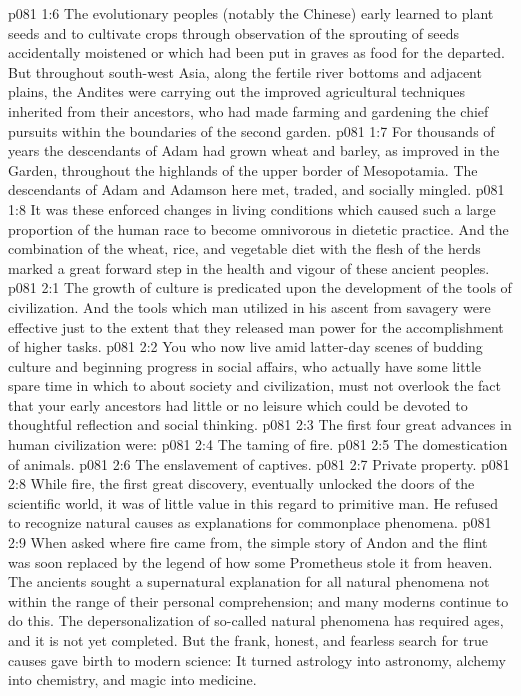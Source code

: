 \vs p081 1:6 The evolutionary peoples (notably the Chinese) early learned to plant seeds and to cultivate crops through observation of the sprouting of seeds accidentally moistened or which had been put in graves as food for the departed. But throughout south\hyp{}west Asia, along the fertile river bottoms and adjacent plains, the Andites were carrying out the improved agricultural techniques inherited from their ancestors, who had made farming and gardening the chief pursuits within the boundaries of the second garden.
\vs p081 1:7 For thousands of years the descendants of Adam had grown wheat and barley, as improved in the Garden, throughout the highlands of the upper border of Mesopotamia. The descendants of Adam and Adamson here met, traded, and socially mingled.
\vs p081 1:8 It was these enforced changes in living conditions which caused such a large proportion of the human race to become omnivorous in dietetic practice. And the combination of the wheat, rice, and vegetable diet with the flesh of the herds marked a great forward step in the health and vigour of these ancient peoples.
\vs p081 2:1 The growth of culture is predicated upon the development of the tools of civilization. And the tools which man utilized in his ascent from savagery were effective just to the extent that they released man power for the accomplishment of higher tasks.
\vs p081 2:2 You who now live amid latter\hyp{}day scenes of budding culture and beginning progress in social affairs, who actually have some little spare time in which to  about society and civilization, must not overlook the fact that your early ancestors had little or no leisure which could be devoted to thoughtful reflection and social thinking.
\vs p081 2:3 \pc The first four great advances in human civilization were:
\vs p081 2:4 \bibnobreakspace The taming of fire.
\vs p081 2:5 \bibnobreakspace The domestication of animals.
\vs p081 2:6 \bibnobreakspace The enslavement of captives.
\vs p081 2:7 \bibnobreakspace Private property.
\vs p081 2:8 \pc While fire, the first great discovery, eventually unlocked the doors of the scientific world, it was of little value in this regard to primitive man. He refused to recognize natural causes as explanations for commonplace phenomena.
\vs p081 2:9 When asked where fire came from, the simple story of Andon and the flint was soon replaced by the legend of how some Prometheus stole it from heaven. The ancients sought a supernatural explanation for all natural phenomena not within the range of their personal comprehension; and many moderns continue to do this. The depersonalization of so\hyp{}called natural phenomena has required ages, and it is not yet completed. But the frank, honest, and fearless search for true causes gave birth to modern science: It turned astrology into astronomy, alchemy into chemistry, and magic into medicine.
